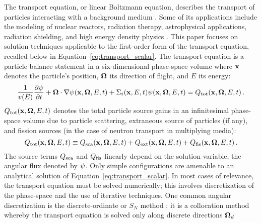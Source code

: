 
The transport equation, or linear Boltzmann equation, describes the
transport of particles interacting with a background medium \cite{glasstone}.  Some
of its applications include the modeling of nuclear reactors, radiation
therapy, astrophysical applications, radiation shielding, and high energy density physics
\cite{glasstone,radiotherapy,astrophysics_textbook,lewis,laser_plasmas}.
This paper focuses on solution techniques applicable to the first-order
form of the transport equation, recalled below in Equation~\eqref{eq:transport_scalar}. The
transport equation is a particle balance statement in a six-dimensional phase-space volume
where $\mathbf{x}$ denotes the particle's position, $\mathbf{\Omega}$ its direction of flight, and $E$ its energy:
\begin{equation}\label{eq:transport_scalar}
  \frac{1}{v(E)}\frac{\partial \psi}{\partial t} + \mathbf{\Omega}\cdot\nabla\psi(\mathbf{x},\mathbf{\Omega},E,t)
    + \Sigma_\textup{t}(\mathbf{x},E,t)\psi(\mathbf{x},\mathbf{\Omega},E,t) = Q_\textup{tot}(\mathbf{x},\mathbf{\Omega},E,t)
  \,.
\end{equation}
$Q_\textup{tot}(\mathbf{x},\mathbf{\Omega},E,t)$ denotes the total particle source gains in an infinitesimal phase-space volume
due to particle scattering, extraneous source of particles (if any), and
fission sources (in the case of neutron transport in multiplying media):
\begin{equation}
  Q_\textup{tot}(\mathbf{x},\mathbf{\Omega},E,t) \equiv Q_\textup{sca}(\mathbf{x},\mathbf{\Omega},E,t) + Q_\textup{ext}(\mathbf{x},\mathbf{\Omega},E,t) + Q_\textup{fis}(\mathbf{x},\mathbf{\Omega},E,t)
  \,.
\end{equation}
The source terms $Q_\textup{sca}$ and $Q_\textup{fis}$ linearly depend on the solution variable, the angular flux denoted by $\psi$. Only simple configurations are amenable to an analytical solution of Equation~\eqref{eq:transport_scalar}.
In most cases of relevance, the transport equation must be solved numerically; this involves discretization
of the phase-space and the use of iterative techniques.
One common angular discretization is the discrete-ordinate or $S_N$ method
\cite{glasstone,lewis,duderstadt}; it is a collocation method whereby the transport equation is solved only along discrete directions $\mathbf{\Omega}_d$
